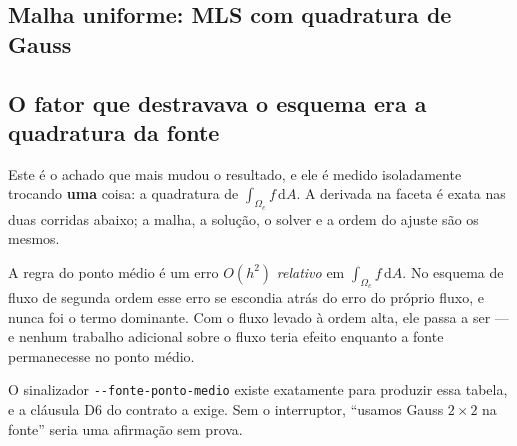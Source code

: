 
\subsection{Malha uniforme: MLS com quadratura de Gauss}




\subsection{O fator que destravava o esquema era a quadratura da fonte}
\label{sec:res-fonte}

Este é o achado que mais mudou o resultado, e ele é medido isoladamente trocando
\textbf{uma} coisa: a quadratura de $\int_{\Omega_c} f\,\mathrm{d}A$. A derivada
na faceta é exata nas duas corridas abaixo; a malha, a solução, o solver e a ordem
do ajuste são os mesmos.


A regra do ponto médio é um erro $O(h^2)$ \emph{relativo} em
$\int_{\Omega_c} f\,\mathrm{d}A$. No esquema de fluxo de segunda ordem esse erro
se escondia atrás do erro do próprio fluxo, e nunca foi o termo dominante. Com o
fluxo levado à ordem alta, ele passa a ser --- e nenhum trabalho adicional sobre o
fluxo teria efeito enquanto a fonte permanecesse no ponto médio.

O sinalizador \verb|--fonte-ponto-medio| existe exatamente para produzir essa
tabela, e a cláusula D6 do contrato a exige. Sem o interruptor, ``usamos Gauss
$2\times2$ na fonte'' seria uma afirmação sem prova.

